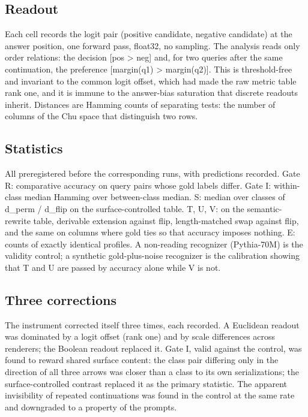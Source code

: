 \hypertarget{readout}{%
\subsection{Readout}\label{readout}}

Each cell records the logit pair (positive candidate, negative
candidate) at the answer position, one forward pass, float32, no
sampling. The analysis reads only order relations: the decision {[}pos
\textgreater{} neg{]} and, for two queries after the same continuation,
the preference {[}margin(q1) \textgreater{} margin(q2){]}. This is
threshold-free and invariant to the common logit offset, which had made
the raw metric table rank one, and it is immune to the answer-bias
saturation that discrete readouts inherit. Distances are Hamming counts
of separating tests: the number of columns of the Chu space that
distinguish two rows.

\hypertarget{statistics}{%
\subsection{Statistics}\label{statistics}}

All preregistered before the corresponding runs, with predictions
recorded. Gate R: comparative accuracy on query pairs whose gold labels
differ. Gate I: within-class median Hamming over between-class median.
S: median over classes of d\_perm / d\_flip on the surface-controlled
table. T, U, V: on the semantic-rewrite table, derivable extension
against flip, length-matched swap against flip, and the same on columns
where gold ties so that accuracy imposes nothing. E: counts of exactly
identical profiles. A non-reading recognizer (Pythia-70M) is the
validity control; a synthetic gold-plus-noise recognizer is the
calibration showing that T and U are passed by accuracy alone while V is
not.

\hypertarget{three-corrections}{%
\subsection{Three corrections}\label{three-corrections}}

The instrument corrected itself three times, each recorded. A Euclidean
readout was dominated by a logit offset (rank one) and by scale
differences across renderers; the Boolean readout replaced it. Gate I,
valid against the control, was found to reward shared surface content:
the class pair differing only in the direction of all three arrows was
closer than a class to its own serializations; the surface-controlled
contrast replaced it as the primary statistic. The apparent invisibility
of repeated continuations was found in the control at the same rate and
downgraded to a property of the prompts.

